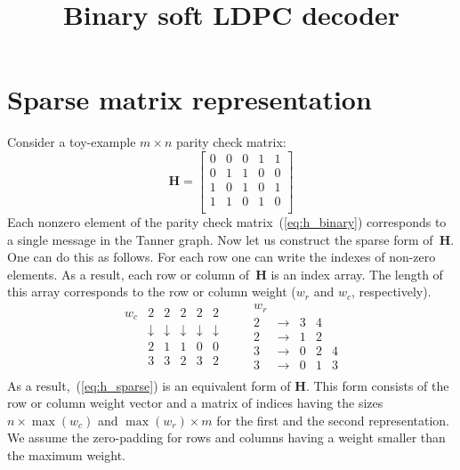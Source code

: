 \documentclass{article}
\title{Binary soft LDPC decoder}
\author{}
\date{}
\begin{document}
\maketitle

\section{Sparse matrix representation}
Consider a toy-example $m\times n$ parity check matrix:
\begin{equation}
\label{eq:h_binary}
\mathbf{H} = \left[
\begin{array}{ccccc}
0 & 0 & 0 & 1 & 1 \\
0 & 1 & 1 & 0 & 0 \\
1 & 0 & 1 & 0 & 1 \\
1 & 1 & 0 & 1 & 0 \\
\end{array}
\right]
\end{equation}
Each nonzero element of the parity check matrix~(\ref{eq:h_binary}) corresponds to a single message in the Tanner graph. Now let us construct the sparse form of~$\mathbf{H}$. One can do this as follows. For each row one can write the indexes of non-zero elements. As a result, each row or column of~$\mathbf{H}$ is an index array. The length of this array corresponds to the row or column weight ($w_r$ and $w_c$, respectively).
\begin{equation}
\label{eq:h_sparse}
\begin{array}{cccccc}
w_c & 2 & 2 & 2 & 2 & 2 \\
 & \downarrow & \downarrow & \downarrow & \downarrow & \downarrow \\
& 2 & 1 & 1 & 0 & 0 \\
& 3 & 3 & 2 & 3 & 2 \\
\end{array}
\quad  \quad
\begin{array}{ccccc}
w_r & & & \\
2 & \rightarrow & 3 & 4 &   \\
2 & \rightarrow & 1 & 2 &   \\
3 & \rightarrow & 0 & 2 & 4 \\
3 & \rightarrow & 0 & 1 & 3 \\
\end{array}
\end{equation}
As a result,~(\ref{eq:h_sparse}) is an equivalent form of $\mathbf{H}$. This form consists of the row or column weight vector and a matrix of indices having the sizes $n \times \max{\left(w_c\right)}$ and $\max{\left(w_r\right) \times m}$ for the first and the second representation. We assume the zero-padding for rows and columns having a weight smaller than the maximum weight.
\end{document}
